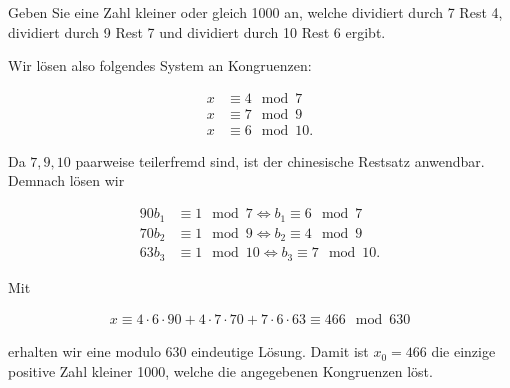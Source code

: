 
\begin{exercise}

Geben Sie eine Zahl kleiner oder gleich 1000 an, welche dividiert
durch 7 Rest 4, dividiert durch 9 Rest 7 und dividiert durch 10 Rest 6 ergibt.

\end{exercise}


\begin{solution}

Wir lösen also folgendes System an Kongruenzen:

\begin{align*}
    x &\equiv 4 \mod{7} \\
    x &\equiv 7 \mod{9} \\
    x &\equiv 6 \mod{10}.
\end{align*}

Da $7,9,10$ paarweise teilerfremd sind, ist der chinesische Restsatz anwendbar.
Demnach lösen wir

\begin{align*}
    90b_1 &\equiv 1 \mod{7} \iff b_1 \equiv 6 \mod{7} \\
    70b_2 &\equiv 1 \mod{9} \iff b_2 \equiv 4 \mod{9} \\
    63b_3 &\equiv 1 \mod{10} \iff b_3 \equiv 7 \mod{10}.
\end{align*}

Mit 

\begin{align*}
    x \equiv 4\cdot 6 \cdot 90 + 4 \cdot 7 \cdot 70 + 7 \cdot 6 \cdot 63 \equiv 466 \mod{630}
\end{align*}

erhalten wir eine modulo 630 eindeutige Lösung.
Damit ist $x_0 = 466$ die einzige positive Zahl kleiner 1000,
welche die angegebenen Kongruenzen löst.


\end{solution}

